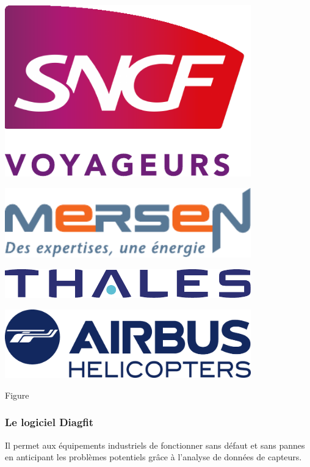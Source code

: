 \vspace{10px}
{\begin{minipage}[c]{0.33\textwidth}
\includegraphics[width=0.8\textwidth]{paper/figures/sncf.pdf}
\end{minipage}
\begin{minipage}[c]{0.5\textwidth}
\includegraphics[width=0.8\textwidth]{paper/figures/mersen.pdf}
\end{minipage}

\begin{minipage}[c]{0.5\textwidth}
\includegraphics[width=0.8\textwidth]{paper/figures/thales.pdf}
\end{minipage}
\begin{minipage}[c]{0.5\textwidth}
\includegraphics[width=0.8\textwidth]{paper/figures/airbus.pdf}
\end{minipage}
}Figure
\label{fig:mon_image}

\subsubsection{Le logiciel Diagfit}
Il permet aux équipements industriels de fonctionner sans défaut et sans pannes en anticipant les problèmes potentiels grâce à l'analyse de données de capteurs.

